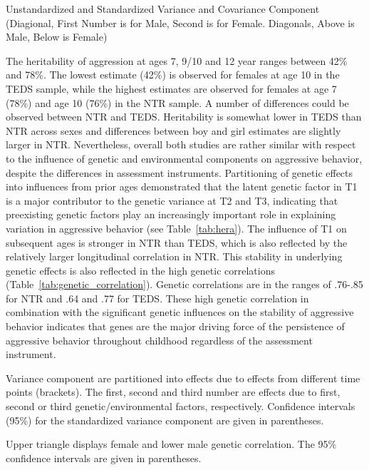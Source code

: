 \begin{table}
  \centering
  \caption{Unstandardized and Standardized Variance and Covariance Component (Diagional,
    First Number is for Male, Second is for Female.
    Diagonals, Above is Male, Below is Female)}\label{tab:var_components}
\end{table}
The heritability of aggression at ages 7, 9/10 and 12 year ranges between 42\% and 78\%.  The lowest estimate (42\%) is observed for females at age 10 in the TEDS sample, while the highest estimates are observed for females at age 7 (78\%) and age 10 (76\%) in the NTR sample.
A number of differences could be observed between NTR and TEDS.
Heritability is somewhat lower in TEDS than NTR across sexes and differences between boy and girl estimates are slightly larger in NTR.
Nevertheless, overall both studies are rather similar with respect to the influence of genetic and environmental components on aggressive behavior, despite the differences in assessment instruments.
Partitioning of genetic effects into influences from prior ages demonstrated that the latent genetic factor in T1 is a major contributor to the genetic variance at T2 and T3, indicating that preexisting genetic factors play an increasingly important role in explaining variation in aggressive behavior (see Table~\ref{tab:hera}).
The influence of T1 on subsequent ages is stronger in NTR than TEDS, which is also reflected by the relatively larger longitudinal correlation in NTR.
This stability in underlying genetic effects is also reflected in the high genetic correlations (Table~\ref{tab:genetic_correlation}).
Genetic correlations are in the ranges of .76-.85 for NTR and .64 and .77 for TEDS.
These high genetic correlation in combination with the significant genetic influences on the stability of aggressive behavior indicates that genes are the major driving force of the persistence of aggressive behavior throughout childhood regardless of the assessment instrument. 

\begin{table}
  \centering
  \caption{Variance component are partitioned into effects due to effects from different time points (brackets).
    The first, second and third number are effects due to first, second or third genetic/environmental factors, respectively.
    Confidence intervals (95\%) for the standardized variance component are given in parentheses.
}\label{tab:hera}
\end{table}

\begin{table}
  \centering
  \caption{Upper triangle displays female and lower male genetic correlation.
    The 95\% confidence intervals are given in parentheses.
}\label{tab:genetic_correlation}
\end{table}
